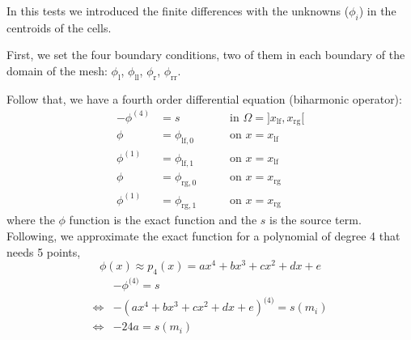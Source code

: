 \documentclass[12pt,a4paper]{article}
\author{Hélder Cruz}
\newcommand{\phil}{\phi_\text{l}}
\newcommand{\phill}{\phi_{\text{ll}}}
\newcommand{\phir}{\phi_\text{r}}
\newcommand{\phirr}{\phi_{\text{rr}}}
\begin{document}
In this tests we introduced the finite differences with the unknowns ($\phi_i$) in the centroids of the cells.

First, we set the four boundary conditions, two of them in each boundary of the domain of the mesh: $\phil$, $\phill$, $\phir$, $\phirr$.

Follow that, we have a fourth order differential equation (biharmonic operator):
\begin{align*}
-\phi^{(4)} & = s && \quad \text{ in } \Omega=]x_\text{lf},x_\text{rg}[\\
\phi & =\phi_{\text{lf},0} && \quad \text{ on } x=x_\text{lf}\\
\phi^{(1)} & =\phi_{\text{lf},1} && \quad \text{ on } x=x_\text{lf}\\
\phi & =\phi_{\text{rg},0} && \quad \text{ on } x=x_\text{rg}\\
\phi^{(1)} & =\phi_{\text{rg},1} && \quad \text{ on } x=x_\text{rg}
\end{align*}
where the $\phi$ function is the exact function and the $s$ is the source term. Following, we approximate the exact function for a polynomial of degree 4 that needs 5 points,
\[
\phi(x)\approx p_4(x)=ax^4+bx^3+cx^2+dx+e
\]
\begin{align*}
&-\phi^{\text{(4)}}=s\\
\Leftrightarrow &-(ax^4+bx^3+cx^2+dx+e)^{\text{(4)}}=s(m_i)\\
\Leftrightarrow &-24a=s(m_i)
\end{align*}
\end{document}
